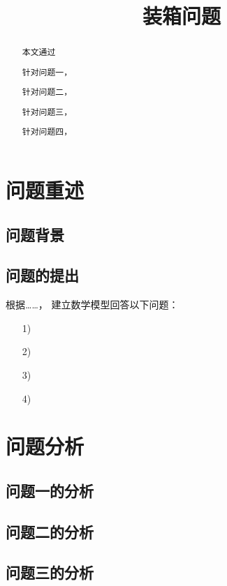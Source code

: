 \documentclass{cumcmthesis}
\title{装箱问题}
\begin{document}
\maketitle
\begin{abstract}
        本文通过

        针对问题一，
        
        针对问题二，
        
        针对问题三，
        
        针对问题四，
        
\end{abstract}

\tableofcontents

\newpage

\section{问题重述}

\subsection{问题背景}
              

\subsection{问题的提出}
    
        根据……，
    建立数学模型回答以下问题：
\begin{itemize}
    \item[1)]
    \item[2)]
    \item[3)]
    \item[4)]
\end{itemize}

\section{问题分析}
\subsection{问题一的分析}   


\subsection{问题二的分析}
        

\subsection{问题三的分析}
        
\end{document}

